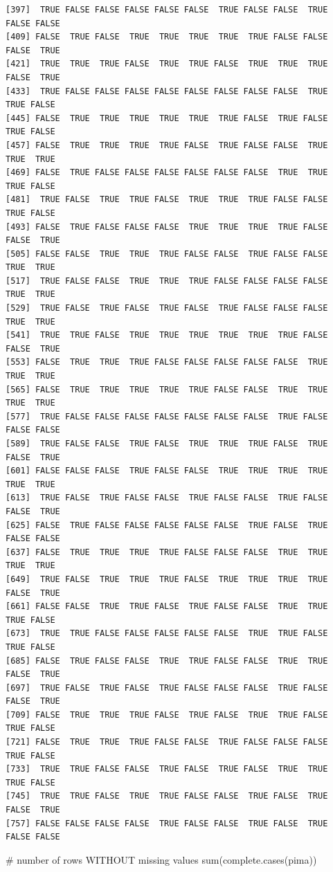 \documentclass[
  letterpaper,
  DIV=11,
  numbers=noendperiod]{scrreprt}
\newenvironment{Shaded}{\begin{snugshade}}{\end{snugshade}}
\newcommand{\CommentTok}[1]{\textcolor[rgb]{0.37,0.37,0.37}{#1}}
\newcommand{\FunctionTok}[1]{\textcolor[rgb]{0.28,0.35,0.67}{#1}}
\newcommand{\NormalTok}[1]{\textcolor[rgb]{0.00,0.23,0.31}{#1}}
\begin{document}
\begin{verbatim}
[397]  TRUE FALSE FALSE FALSE FALSE FALSE  TRUE FALSE FALSE  TRUE FALSE FALSE
[409] FALSE  TRUE FALSE  TRUE  TRUE  TRUE  TRUE  TRUE FALSE FALSE FALSE  TRUE
[421]  TRUE  TRUE  TRUE FALSE  TRUE  TRUE FALSE  TRUE  TRUE  TRUE FALSE  TRUE
[433]  TRUE FALSE FALSE FALSE FALSE FALSE FALSE FALSE FALSE  TRUE  TRUE FALSE
[445] FALSE  TRUE  TRUE  TRUE  TRUE  TRUE  TRUE FALSE  TRUE FALSE  TRUE FALSE
[457] FALSE  TRUE  TRUE  TRUE  TRUE FALSE  TRUE FALSE FALSE  TRUE  TRUE  TRUE
[469] FALSE  TRUE FALSE FALSE FALSE FALSE FALSE FALSE  TRUE  TRUE  TRUE FALSE
[481]  TRUE FALSE  TRUE  TRUE FALSE  TRUE  TRUE  TRUE FALSE FALSE  TRUE FALSE
[493] FALSE  TRUE FALSE FALSE FALSE  TRUE  TRUE  TRUE  TRUE FALSE FALSE  TRUE
[505] FALSE FALSE  TRUE  TRUE  TRUE FALSE FALSE  TRUE FALSE FALSE  TRUE  TRUE
[517]  TRUE FALSE FALSE  TRUE  TRUE  TRUE FALSE FALSE FALSE FALSE  TRUE  TRUE
[529]  TRUE FALSE  TRUE FALSE  TRUE FALSE  TRUE FALSE FALSE FALSE  TRUE  TRUE
[541]  TRUE  TRUE FALSE  TRUE  TRUE  TRUE  TRUE  TRUE  TRUE FALSE FALSE  TRUE
[553] FALSE  TRUE  TRUE  TRUE FALSE FALSE FALSE FALSE FALSE  TRUE  TRUE  TRUE
[565] FALSE  TRUE  TRUE  TRUE  TRUE  TRUE FALSE FALSE  TRUE  TRUE  TRUE  TRUE
[577]  TRUE FALSE FALSE FALSE FALSE FALSE FALSE FALSE  TRUE FALSE FALSE FALSE
[589]  TRUE FALSE FALSE  TRUE FALSE  TRUE  TRUE  TRUE FALSE  TRUE FALSE  TRUE
[601] FALSE FALSE FALSE  TRUE FALSE FALSE  TRUE  TRUE  TRUE  TRUE  TRUE  TRUE
[613]  TRUE FALSE  TRUE FALSE FALSE  TRUE FALSE FALSE  TRUE FALSE FALSE  TRUE
[625] FALSE  TRUE FALSE FALSE FALSE FALSE FALSE  TRUE FALSE  TRUE FALSE FALSE
[637] FALSE  TRUE  TRUE  TRUE  TRUE FALSE FALSE FALSE  TRUE  TRUE  TRUE  TRUE
[649]  TRUE FALSE  TRUE  TRUE  TRUE FALSE  TRUE  TRUE  TRUE  TRUE FALSE  TRUE
[661] FALSE FALSE  TRUE  TRUE FALSE  TRUE FALSE FALSE  TRUE  TRUE  TRUE FALSE
[673]  TRUE  TRUE FALSE FALSE FALSE FALSE FALSE  TRUE  TRUE FALSE  TRUE FALSE
[685] FALSE  TRUE FALSE FALSE  TRUE  TRUE FALSE FALSE  TRUE  TRUE FALSE  TRUE
[697]  TRUE FALSE  TRUE FALSE  TRUE FALSE FALSE FALSE  TRUE FALSE FALSE  TRUE
[709] FALSE  TRUE  TRUE  TRUE FALSE  TRUE FALSE  TRUE  TRUE FALSE  TRUE FALSE
[721] FALSE  TRUE  TRUE  TRUE FALSE FALSE  TRUE FALSE FALSE FALSE  TRUE FALSE
[733]  TRUE  TRUE FALSE FALSE  TRUE FALSE  TRUE FALSE  TRUE  TRUE  TRUE FALSE
[745]  TRUE  TRUE FALSE  TRUE  TRUE FALSE FALSE  TRUE FALSE  TRUE FALSE  TRUE
[757] FALSE FALSE FALSE FALSE  TRUE FALSE FALSE  TRUE FALSE  TRUE FALSE FALSE
\end{verbatim}

\begin{Shaded}
\begin{Highlighting}[]
\CommentTok{\# number of rows WITHOUT missing values}
\FunctionTok{sum}\NormalTok{(}\FunctionTok{complete.cases}\NormalTok{(pima)) }
\end{Highlighting}
\end{Shaded}
\end{document}
